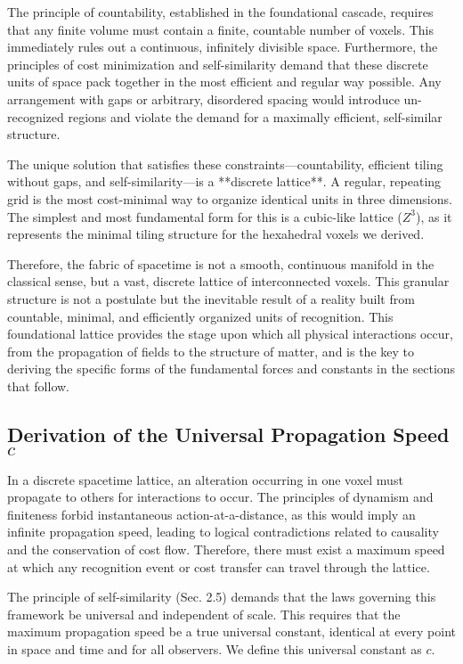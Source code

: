 The principle of countability, established in the foundational cascade, requires that any finite volume must contain a finite, countable number of voxels. This immediately rules out a continuous, infinitely divisible space. Furthermore, the principles of cost minimization and self-similarity demand that these discrete units of space pack together in the most efficient and regular way possible. Any arrangement with gaps or arbitrary, disordered spacing would introduce un-recognized regions and violate the demand for a maximally efficient, self-similar structure.

The unique solution that satisfies these constraints—countability, efficient tiling without gaps, and self-similarity—is a **discrete lattice**. A regular, repeating grid is the most cost-minimal way to organize identical units in three dimensions. The simplest and most fundamental form for this is a cubic-like lattice (\(Z^3\)), as it represents the minimal tiling structure for the hexahedral voxels we derived.

Therefore, the fabric of spacetime is not a smooth, continuous manifold in the classical sense, but a vast, discrete lattice of interconnected voxels. This granular structure is not a postulate but the inevitable result of a reality built from countable, minimal, and efficiently organized units of recognition. This foundational lattice provides the stage upon which all physical interactions occur, from the propagation of fields to the structure of matter, and is the key to deriving the specific forms of the fundamental forces and constants in the sections that follow.

\subsection{Derivation of the Universal Propagation Speed \texorpdfstring{$c$}{c}}
In a discrete spacetime lattice, an alteration occurring in one voxel must propagate to others for interactions to occur. The principles of dynamism and finiteness forbid instantaneous action-at-a-distance, as this would imply an infinite propagation speed, leading to logical contradictions related to causality and the conservation of cost flow. Therefore, there must exist a maximum speed at which any recognition event or cost transfer can travel through the lattice.

The principle of self-similarity (Sec. 2.5) demands that the laws governing this framework be universal and independent of scale. This requires that the maximum propagation speed be a true universal constant, identical at every point in space and time and for all observers. We define this universal constant as \(c\).

